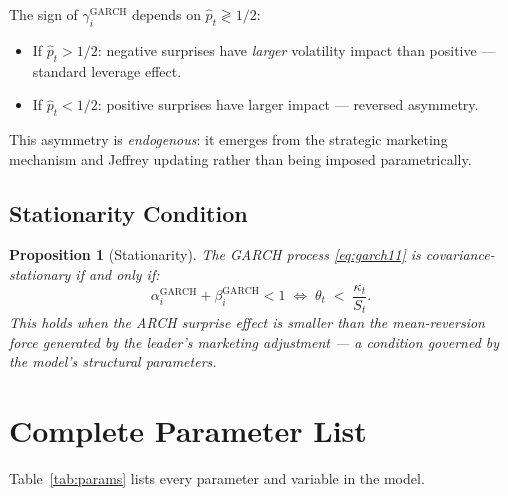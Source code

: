 \documentclass[12pt,a4paper]{article}
\newtheorem{proposition}{Proposition}[section]
\newcommand{\1}{\mathbf{1}}
\begin{document}
The sign of $\gamma_i^{\mathrm{GARCH}}$ depends on $\hat{p}_t \gtrless 1/2$:
\begin{itemize}
  \item If $\hat{p}_t > 1/2$: negative surprises have \emph{larger} volatility impact than positive — standard leverage effect.
  \item If $\hat{p}_t < 1/2$: positive surprises have larger impact — reversed asymmetry.
\end{itemize}
This asymmetry is \emph{endogenous}: it emerges from the strategic marketing mechanism and Jeffrey updating rather than being imposed parametrically.

\subsection{Stationarity Condition}

\begin{proposition}[Stationarity]
The GARCH process \eqref{eq:garch11} is covariance-stationary if and only if:
\[
  \alpha_i^{\mathrm{GARCH}} + \beta_i^{\mathrm{GARCH}} < 1
  \;\iff\;
  \theta_t \;<\; \frac{\kappa_t}{S_t}.
\]
This holds when the ARCH surprise effect is smaller than the mean-reversion force generated by the leader's marketing adjustment — a condition governed by the model's structural parameters.
\end{proposition}

\section{Complete Parameter List}

Table~\ref{tab:params} lists every parameter and variable in the model.
\end{document}
